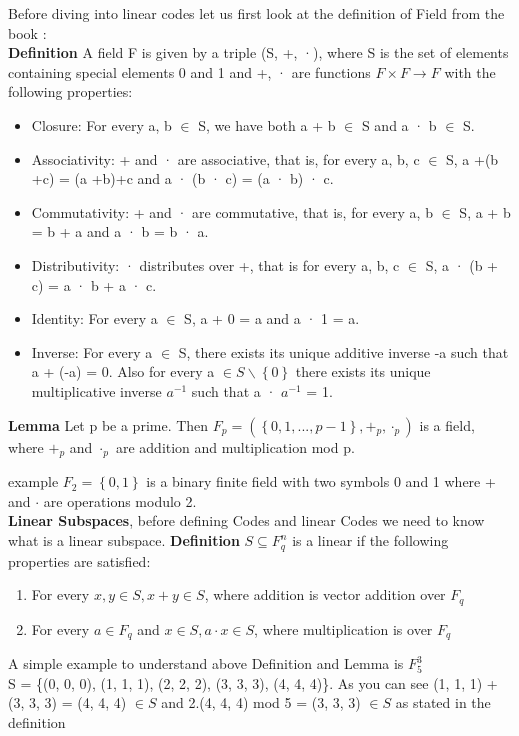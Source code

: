 Before diving into linear codes let us first look at the definition of Field from the book \cite{chap2}:\\
\textbf{Definition} A field F is given by a triple (S, +, ·), where S is the set of elements containing
special elements 0 and 1 and +, · are functions $F \times F \rightarrow F$ with the following properties:
\begin{itemize}\itemsep-\the\parsep
	\item Closure: For every a, b $\in$ S, we have both a + b $\in$ S and a · b $\in$ S.
	\item Associativity: + and · are associative, that is, for every a, b, c $\in$ S, a +(b +c) = (a +b)+c and a · (b · c) = (a · b) · c.
	\item Commutativity: + and · are commutative, that is, for every a, b $\in$ S, a + b = b + a and a · b = b · a.
	\item Distributivity: · distributes over +, that is for every a, b, c $\in$ S, a · (b + c) = a · b + a · c.
	\item Identity: For every a $\in$ S, a + 0 = a and a · 1 = a.
	\item Inverse: For every a $\in$ S, there exists its unique additive inverse -a such that a + (-a) = 0. Also for every a $\in S \backslash \left\{0\right\}$ there exists its unique multiplicative inverse $a^{-1}$ such that a · $a^{-1}$ = 1.
\end{itemize}

\textbf{Lemma} Let p be a prime. Then $F_p = (\left\{0, 1, . . . , p - 1\right\}, +_p , \cdot_p )$ is a field, where $+_p$ and $\cdot_p$ are
addition and multiplication mod p. \cite{chap2}

example $F_2 = \left\{0,1\right\}$ is a binary finite field with two symbols 0 and 1 where + and $\cdot$ are operations modulo 2.\\

\textbf{Linear Subspaces},  before defining Codes and linear Codes we need to know what is a linear subspace.
\textbf{Definition} $ S \subseteq F_q^n $ is a linear if the following properties are satisfied:\cite{chap2}
\begin{enumerate}
	\item For every $x,y \in S, x+y \in S$, where addition is vector addition over $F_q$
	\item For every $a \in F_q$ and $x \in S, a\cdot x\in S$, where multiplication is over $F_q$
\end{enumerate}

A simple example to understand above Definition and Lemma is $F_5^3$\\
S = \{(0, 0, 0), (1, 1, 1), (2, 2, 2), (3, 3, 3), (4, 4, 4)\}.
As you can see (1, 1, 1) + (3, 3, 3) = (4, 4, 4) $\in S$ and 2.(4, 4, 4) mod 5 = (3, 3, 3) $\in S$ as stated in the definition

